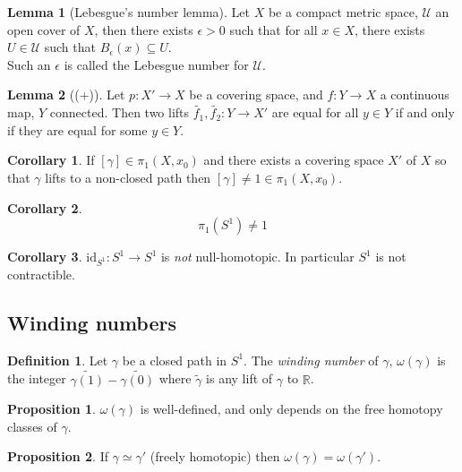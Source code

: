 \documentclass[a4paper,14pt]{extarticle}
\theoremstyle{definition}
\newtheorem*{definition}{Definition}
\newtheorem*{lemma}{Lemma}
\newtheorem*{corollary}{Corollary}
\newtheorem*{proposition}{Proposition}
\begin{document}
\begin{lemma}[Lebesgue's number lemma]
  Let $X$ be a compact metric space, $\mathcal{U}$ an open cover of $X$, then there 
  exists $\epsilon>0$ such that for all $x\in X$, there exists $U\in\mathcal{U}$ such that 
  $B_\epsilon(x)\subseteq U$. \\
  Such an $\epsilon$ is called the Lebesgue number for $\mathcal{U}$.
\end{lemma}

\begin{lemma}[(+)]
  Let $p:X'\rightarrow X$ be a covering space, and $f:Y\rightarrow X$ a continuous map, $Y$ 
  connected. Then two lifts $\tilde{f_1},\tilde{f_2}:Y\rightarrow X'$ are equal for all 
  $y\in Y$ if and only if they are equal for some $y\in Y$.
\end{lemma}

\begin{corollary}
  If $[\gamma]\in\pi_1(X,x_0)$ and there exists a covering space $X'$ of $X$ so that 
  $\gamma$ lifts to a non-closed path then $[\gamma]\neq1\in\pi_1(X,x_0)$.
\end{corollary}

\begin{corollary}
  \[\pi_1(S^1)\neq1\]
\end{corollary}

\begin{corollary}
  $\text{id}_{S^1}:S^1\rightarrow S^1$ is \emph{not} null-homotopic. In particular $S^1$
  is not contractible.
\end{corollary}

\subsection{Winding numbers}
\begin{definition}
  Let $\gamma$ be a closed path in $S^1$. The \emph{winding number} of $\gamma$, 
  $\omega(\gamma)$ is the integer $\tilde{\gamma(1)}-\tilde{\gamma(0)}$ where $\tilde{\gamma}$
  is any lift of $\gamma$ to $\mathbb{R}$.
\end{definition}

\begin{proposition}
  $\omega(\gamma)$ is well-defined, and only depends on the free homotopy classes of $\gamma$.
\end{proposition}

\begin{proposition}
  If $\gamma\simeq\gamma'$ (freely homotopic) then $\omega(\gamma)=\omega(\gamma')$.
\end{proposition}
\end{document}
